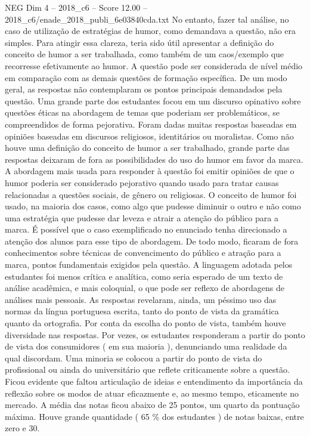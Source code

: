 \begin{textsample}{NEG Dim 4 – 2018\_c6 – Score 12.00 – 2018\_c6/enade\_2018\_publi\_6e03840cda.txt}
No entanto, fazer tal análise, no caso de utilização de estratégias de humor, como demandava a questão, não era simples.
Para atingir essa clareza, teria sido útil apresentar a definição do conceito de humor a ser trabalhada, como também de um caos/exemplo que recorresse efetivamente ao humor.
A questão pode ser considerada de nível médio em comparação com as demais questões de formação específica.
De um modo geral, as respostas não contemplaram os pontos principais demandados pela questão.
Uma grande parte dos estudantes focou em um discurso opinativo sobre questões éticas na abordagem de temas que poderiam ser problemáticos, se compreendidos de forma pejorativa.
Foram dadas muitas respostas baseadas em opiniões baseadas em discursos religiosos, identitários ou moralistas.
Como não houve uma definição do conceito de humor a ser trabalhado, grande parte das respostas deixaram de fora as possibilidades do uso do humor em favor da marca.
A abordagem mais usada para responder à questão foi emitir opiniões de que o humor poderia ser considerado pejorativo quando usado para tratar causas relacionadas a questões sociais, de gênero ou religiosas.
O conceito de humor foi usado, na maioria dos casos, como algo que pudesse diminuir o outro e não como uma estratégia que pudesse dar leveza e atrair a atenção do público para a marca.
É possível que o caso exemplificado no enunciado tenha direcionado a atenção dos alunos para esse tipo de abordagem.
De todo modo, ficaram de fora conhecimentos sobre técnicas de convencimento do público e atração para a marca, pontos fundamentais exigidos pela questão.
A linguagem adotada pelos estudantes foi menos crítica e analítica, como seria esperado de um texto de análise acadêmica, e mais coloquial, o que pode ser reflexo de abordagens de análises mais pessoais.
As respostas revelaram, ainda, um péssimo uso das normas da língua portuguesa escrita, tanto do ponto de vista da gramática quanto da ortografia.
Por conta da escolha do ponto de vista, também houve diversidade nas respostas.
Por vezes, os estudantes responderam a partir do ponto de vista dos consumidores ( em sua maioria ), denunciando uma realidade da qual discordam.
Uma minoria se colocou a partir do ponto de vista do profissional ou ainda do universitário que reflete criticamente sobre a questão.
Ficou evidente que faltou articulação de ideias e entendimento da importância da reflexão sobre os modos de atuar eficazmente e, ao mesmo tempo, eticamente no mercado.
A média das notas ficou abaixo de 25 pontos, um quarto da pontuação máxima.
Houve grande quantidade ( 65 \% dos estudantes ) de notas baixas, entre zero e 30.

\end{textsample}
